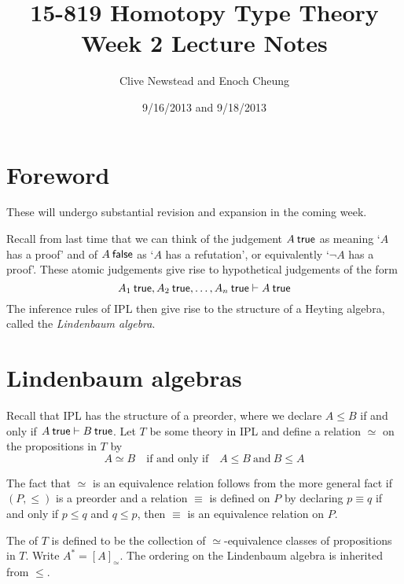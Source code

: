 \documentclass[12pt]{article}
\newenvironment{definition}[1][Definition.]{\begin{trivlist}\item[\hskip \labelsep {\bfseries #1}]}{\end{trivlist}}
\begin{document}
\title{15-819 Homotopy Type Theory\\ Week 2 Lecture Notes}
\author{Clive Newstead and Enoch Cheung}
\date{9/16/2013 and 9/18/2013}

\maketitle

\section*{Foreword}

These will undergo substantial revision and expansion in the coming week.

Recall from last time that we can think of the judgement $A \true$ as meaning `$A$ has a proof' and of $A \postfixjudgment{false}$ as `$A$ has a refutation', or equivalently `$\neg A$ has a proof'. These atomic judgements give rise to hypothetical judgements of the form
$$A_1 \true, A_2 \true, \dots, A_n \true \vdash A \true$$
The inference rules of \acl{IPL} then give rise to the structure of a Heyting algebra, called the \emph{Lindenbaum algebra}.

\section{Lindenbaum algebras}

Recall that \acs{IPL} has the structure of a preorder, where we declare $A \le B$ if and only if $A \true \vdash B \true$. Let $T$ be some theory in \acl{IPL} and define a relation $\simeq$ on the propositions in $T$ by
\begin{equation*}
A \simeq B \quad \text{if and only if} \quad A \le B\ \text{and}\ B \le A
\end{equation*}

The fact that $\simeq$ is an equivalence relation follows from the more general fact if $(P, \le)$ is a preorder and a relation $\equiv$ is defined on $P$ by declaring $p \equiv q$ if and only if $p \le q$ and $q \le p$, then $\equiv$ is an equivalence relation on $P$.

\begin{definition}
The  of $T$ is defined to be the collection of $\simeq$-equivalence classes of propositions in $T$. Write $A^* = [A]_{\simeq}$. The ordering on the Lindenbaum algebra is inherited from $\le$.
\end{definition}
\end{document}
